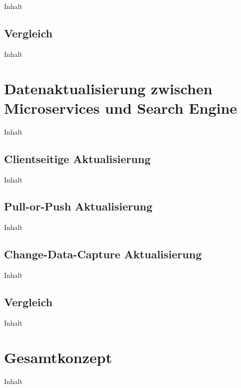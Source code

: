 Inhalt

\subsection{Vergleich\label{subsec4.3.4:Unterunterpunkt-4}}

Inhalt

\section{Datenaktualisierung zwischen Microservices und Search Engine\label{sec4.4:Unterpunkt-4}}

Inhalt

\subsection{Clientseitige Aktualisierung\label{subsec4.4.1:Unterunterpunkt-1}}

Inhalt

\subsection{Pull-or-Push Aktualisierung\label{subsec4.4.2:Unterunterpunkt-2}}

Inhalt

\subsection{Change-Data-Capture Aktualisierung\label{subsec4.4.3:Unterunterpunkt-3}}

Inhalt

\subsection{Vergleich\label{subsec4.4.4:Unterunterpunkt-4}}

Inhalt

\section{Gesamtkonzept\label{sec4.5:Unterpunkt-5}}

Inhalt